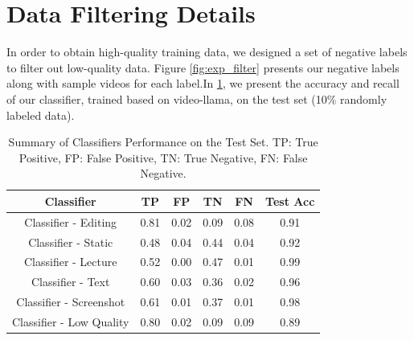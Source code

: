 \vspace{-0.5em}
\section{Data Filtering Details}
\label{ap:data_filtering_details}
In order to obtain high-quality training data, we designed a set of negative labels to filter out low-quality data. Figure \ref{fig:exp_filter} presents our negative labels along with sample videos for each label.In \cref{tab:classifier}, we present the accuracy and recall of our classifier, trained based on video-llama, on the test set (10\% randomly labeled data).

\begin{table}[h]
    \centering
    \caption{Summary of Classifiers Performance on the Test Set. TP: True Positive, FP: False Positive, TN: True Negative, FN: False Negative.}
        \begin{tabular}{cccccc}
        \toprule
        Classifier & TP  & FP & TN & FN & Test Acc \\
        \midrule
        Classifier - Editing & 0.81 & 0.02 & 0.09 &  0.08 & 0.91 \\ 
        Classifier - Static & 0.48 & 0.04 & 0.44 & 0.04 & 0.92 \\
        Classifier - Lecture & 0.52 & 0.00 & 0.47 & 0.01 & 0.99 \\
        Classifier - Text & 0.60 & 0.03 & 0.36 & 0.02 & 0.96 \\
        Classifier - Screenshot & 0.61 & 0.01 & 0.37 & 0.01 & 0.98 \\
        Classifier - Low Quality & 0.80 & 0.02 & 0.09 & 0.09 & 0.89 \\
        \bottomrule
        \end{tabular}
    \label{tab:classifier}
\end{table}

